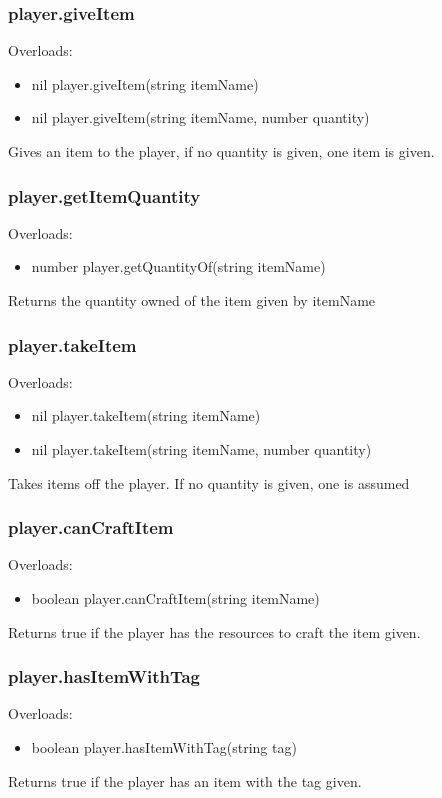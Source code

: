 \documentclass{book}
\newenvironment{ulist}
	{\begin{itemize}
			\itemsep0em}
	{\end{itemize}}
\begin{document}
\subsubsection{player.giveItem}
Overloads:
\begin{ulist}
	\item nil player.giveItem(string itemName)
	\item nil player.giveItem(string itemName, number quantity)
\end{ulist}
Gives an item to the player, if no quantity is given, one item is given.

\subsubsection{player.getItemQuantity}
Overloads:
\begin{ulist}
	\item number player.getQuantityOf(string itemName)
\end{ulist}
Returns the quantity owned of the item given by itemName

\subsubsection{player.takeItem}
Overloads:
\begin{ulist}
	\item nil player.takeItem(string itemName)
	\item nil player.takeItem(string itemName, number quantity)
\end{ulist}
Takes items off the player. If no quantity is given, one is assumed

\subsubsection{player.canCraftItem}
Overloads:
\begin{ulist}
	\item boolean player.canCraftItem(string itemName)
\end{ulist}
Returns true if the player has the resources to craft the item given.

\subsubsection{player.hasItemWithTag}
Overloads:
\begin{ulist}
	\item boolean player.hasItemWithTag(string tag)
\end{ulist}
Returns true if the player has an item with the tag given.
\end{document}
